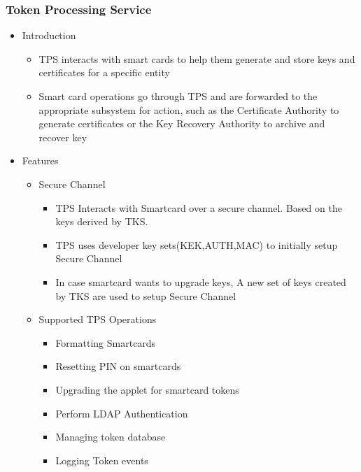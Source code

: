 \documentclass[a4paper]{article}
\begin{document}
\subsubsection{Token Processing Service}
    \begin{itemize}
            \item Introduction
                \begin{itemize}
                    \item TPS interacts with smart cards to help them generate and store keys and certificates for a specific entity
                    \item Smart card operations go through TPS and are forwarded to the appropriate subsystem for action, 
                        such as the Certificate Authority to generate certificates or the Key Recovery Authority to archive and recover key
                \end{itemize}
            \item Features
                \begin{itemize}
                    \item Secure Channel
                        \begin{itemize}
                            \item TPS Interacts with Smartcard over a secure channel. Based on the keys derived
                                by TKS.
                            \item TPS uses developer key sets(KEK,AUTH,MAC) to initially setup Secure Channel
                            \item In case smartcard wants to upgrade keys, A new set of keys created by TKS are used
                                to setup Secure Channel
                        \end{itemize}
                    \item Supported TPS Operations
                        \begin{itemize}
                            \item Formatting Smartcards
                            \item Resetting PIN on smartcards
                            \item Upgrading the applet for smartcard tokens
                            \item Perform LDAP Authentication
                            \item Managing token database
                            \item Logging Token events

\end{itemize}
\end{itemize}
\end{itemize}
\end{document}
